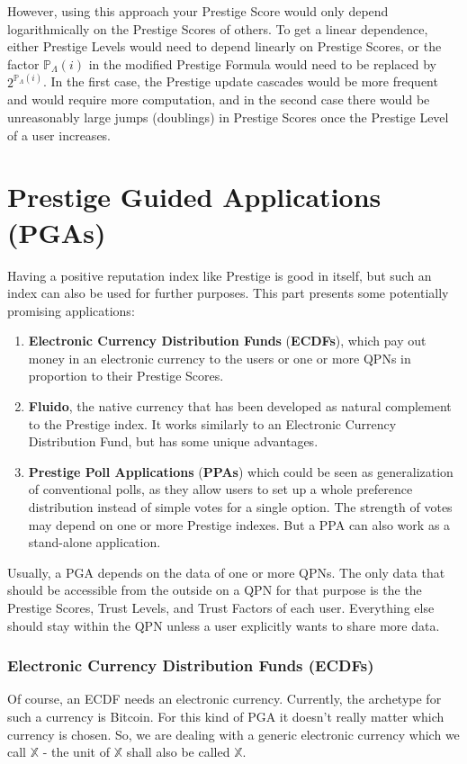 \documentclass[a4paper,12pt]{scrartcl}
\begin{document}
However, using this approach your Prestige Score would only depend logarithmically on the Prestige Scores of others. To get a linear dependence, either Prestige Levels would need to depend linearly on Prestige Scores, or the factor $\mathbb{P}_{\Lambda}(i)$ in the modified Prestige Formula would need to be replaced by $2^{\mathbb{P}_{\Lambda}(i)}$. In the first case, the Prestige update cascades would be more frequent and would require more computation, and in the second case there would be unreasonably large jumps (doublings) in Prestige Scores once the Prestige Level of a user increases.


\part{Prestige Guided Applications (PGAs)}\label{PGAs}
Having a positive reputation index like Prestige is good in itself, but such an index can also be used for further purposes. This part presents some potentially promising applications:

\begin{enumerate}
 \item \textbf{Electronic Currency Distribution Funds} (\textbf{ECDFs}), which pay out money in an electronic currency to the users or one or more QPNs in proportion to their Prestige Scores.
 \item \textbf{Fluido}, the native currency that has been developed as natural complement to the Prestige index. It works similarly to an Electronic Currency Distribution Fund, but has some unique advantages.
 \item \textbf{Prestige Poll Applications} (\textbf{PPAs}) which could be seen as generalization of conventional polls, as they allow users to set up a whole preference distribution instead of simple votes for a single option. The strength of votes may depend on one or more Prestige indexes. But a PPA can also work as a stand-alone application.
\end{enumerate}

Usually, a PGA depends on the data of one or more QPNs. The only data that should be accessible from the outside on a QPN for that purpose is the the Prestige Scores, Trust Levels, and Trust Factors of each user. Everything else should stay within the QPN unless a user explicitly wants to share more data.

\section{Electronic Currency Distribution Funds (ECDFs)}
Of course, an ECDF needs an electronic currency. Currently, the archetype for such a currency is Bitcoin. For this kind of PGA it doesn't really matter which currency is chosen. So, we are dealing with a generic electronic currency which we call $\mathbb{X}$ - the unit of $\mathbb{X}$ shall also be called $\mathbb{X}$.
\end{document}
